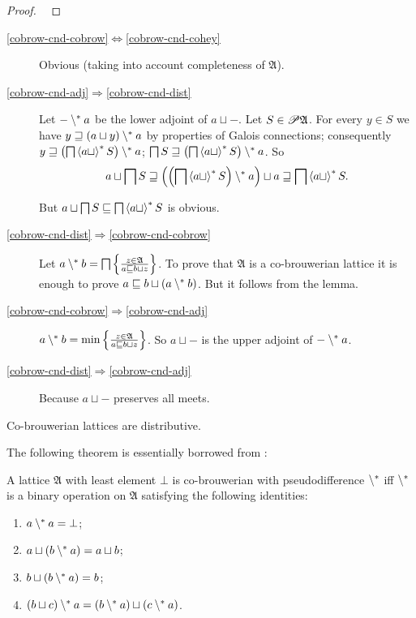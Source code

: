 \begin{proof}
~\end{proof}
\begin{description}
\item [{\ref{cobrow-cnd-cobrow}$\Leftrightarrow$\ref{cobrow-cnd-cohey}}] Obvious
(taking into account completeness of $\mathfrak{A}$).
\item [{\ref{cobrow-cnd-adj}$\Rightarrow$\ref{cobrow-cnd-dist}}] Let
$\mathord-\setminus^{\ast} a$ be the lower adjoint of $a\sqcup\mathord-$.
Let $S\in\mathscr{P}\mathfrak{A}$. For every $y\in S$ we have $y\sqsupseteq(a\sqcup y)\setminus^{\ast} a$
by properties of Galois connections; consequently $y\sqsupseteq\left(\bigsqcap\left\langle a\sqcup\right\rangle ^{\ast}S\right)\setminus^{\ast} a$;
$\bigsqcap S\sqsupseteq\left(\bigsqcap\left\langle a\sqcup\right\rangle ^{\ast}S\right)\setminus^{\ast} a$.
So
\[
a\sqcup\bigsqcap S\sqsupseteq\left(\left(\bigsqcap\left\langle a\sqcup\right\rangle ^{\ast}S\right)\setminus^{\ast} a\right)\sqcup a\sqsupseteq\bigsqcap\left\langle a\sqcup\right\rangle ^{\ast}S.
\]



But $a\sqcup\bigsqcap S\sqsubseteq\bigsqcap\left\langle a\sqcup\right\rangle ^{\ast}S$ is
obvious.

\item [{\ref{cobrow-cnd-dist}$\Rightarrow$\ref{cobrow-cnd-cobrow}}] Let
$a\setminus^{\ast} b=\bigsqcap\left\{ \frac{z\in\mathfrak{A}}{a\sqsubseteq b\sqcup z}\right\}$.
To prove that $\mathfrak{A}$ is a co-brouwerian lattice it is enough
to prove $a\sqsubseteq b\sqcup(a\setminus^{\ast} b)$. But it follows from
the lemma.
\item [{\ref{cobrow-cnd-cobrow}$\Rightarrow$\ref{cobrow-cnd-adj}}] $a\setminus^{\ast} b=\min\left\{ \frac{z\in\mathfrak{A}}{a\sqsubseteq b\sqcup z}\right\}$.
So $a\sqcup\mathord-$ is the upper adjoint of $\mathord-\setminus^{\ast} a$.
\item [{\ref{cobrow-cnd-dist}$\Rightarrow$\ref{cobrow-cnd-adj}}] Because
$a\sqcup\mathord-$ preserves all meets.\end{description}
\begin{cor}
Co-brouwerian lattices are distributive.
\end{cor}
The following theorem is essentially borrowed from \cite{stone-spaces}:
\begin{thm}
A lattice $\mathfrak{A}$ with least element $\bot$ is co-brouwerian
with pseudodifference $\setminus^{\ast}$ iff $\setminus^{\ast}$ is a binary
operation on $\mathfrak{A}$ satisfying the following identities:
\begin{enumerate}
\item \label{cbpd-aa}$a\setminus^{\ast} a=\bot$;
\item \label{cbpd-aba}$a\sqcup(b\setminus^{\ast} a)=a\sqcup b$;
\item \label{cbpd-bba}$b\sqcup(b\setminus^{\ast} a)=b$;
\item \label{cbpd-bca}$(b\sqcup c)\setminus^{\ast} a=(b\setminus^{\ast} a)\sqcup(c\setminus^{\ast} a)$.
\end{enumerate}
\end{thm}

